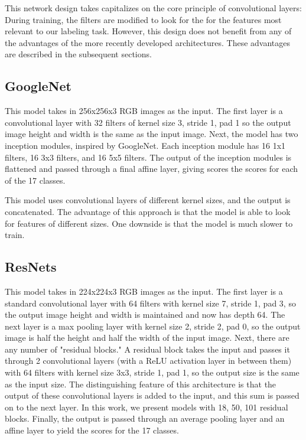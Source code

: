 \documentclass[10pt,twocolumn,letterpaper]{article}
\begin{document}
This network design takes capitalizes on the core principle of convolutional layers: During training, the filters are modified to look for the for the features most relevant to our labeling task. However, this design does not benefit from any of the advantages of the more recently developed architectures. These advantages are described in the subsequent sections.

\subsection*{GoogleNet}
This model takes in 256x256x3 RGB images as the input. The first layer is a convolutional layer with 32 filters of kernel size 3, stride 1, pad 1 so the output image height and width is the same as the input image. Next, the model has two inception modules, inspired by GoogleNet.\cite{GoogleNet} Each inception module has 16 1x1 filters, 16 3x3 filters, and 16 5x5 filters. The output of the inception modules is flattened and passed through a final affine layer, giving scores the scores for each of the 17 classes.

This model uses convolutional layers of different kernel sizes, and the output is concatenated. The advantage of this approach is that the model is able to look for features of different sizes. One downside is that the model is much slower to train.

\subsection*{ResNets}
This model takes in 224x224x3 RGB images as the input. The first layer is a standard convolutional layer with 64 filters with kernel size 7, stride 1, pad 3, so the output image height and width is maintained and now has depth 64. The next layer is a max pooling layer with kernel size 2, stride 2, pad 0, so the output image is half the height and half the width of the input image. Next, there are any number of "residual blocks." A residual block takes the input and passes it through 2 convolutional layers (with a ReLU activation layer in between them) with 64 filters with kernel size 3x3, stride 1, pad 1, so the output size is the same as the input size. The distinguishing feature of this architecture is that the output of these convolutional layers is added to the input, and this sum is passed on to the next layer. In this work, we present models with 18, 50, 101 residual blocks. Finally, the output is passed through an average pooling layer and an affine layer to yield the scores for the 17 classes.
\end{document}
